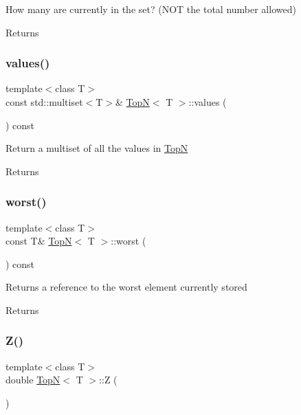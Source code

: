 How many are currently in the set? (N\+OT the total number allowed) \begin{DoxyReturn}{Returns}

\end{DoxyReturn}
\mbox{\label{class_top_n_a50b05f8d4580c4652e8c1f6770943adc}} 
\subsubsection{\texorpdfstring{values()}{values()}}
{\footnotesize\ttfamily template$<$class T$>$ \\
const std\+::multiset$<$T$>$\& \hyperlink{class_top_n}{TopN}$<$ T $>$\+::values (\begin{DoxyParamCaption}{ }\end{DoxyParamCaption}) const\hspace{0.3cm}{\ttfamily [inline]}}

Return a multiset of all the values in \hyperlink{class_top_n}{TopN} \begin{DoxyReturn}{Returns}

\end{DoxyReturn}
\mbox{\label{class_top_n_a29d25f1254f2c2e31612004593afa498}} 
\subsubsection{\texorpdfstring{worst()}{worst()}}
{\footnotesize\ttfamily template$<$class T$>$ \\
const T\& \hyperlink{class_top_n}{TopN}$<$ T $>$\+::worst (\begin{DoxyParamCaption}{ }\end{DoxyParamCaption}) const\hspace{0.3cm}{\ttfamily [inline]}}

Returns a reference to the worst element currently stored \begin{DoxyReturn}{Returns}

\end{DoxyReturn}
\mbox{\label{class_top_n_a94191264b36318ce50e32c36018ef104}} 
\subsubsection{\texorpdfstring{Z()}{Z()}}
{\footnotesize\ttfamily template$<$class T$>$ \\
double \hyperlink{class_top_n}{TopN}$<$ T $>$\+::Z (\begin{DoxyParamCaption}{ }\end{DoxyParamCaption})\hspace{0.3cm}{\ttfamily [inline]}}

